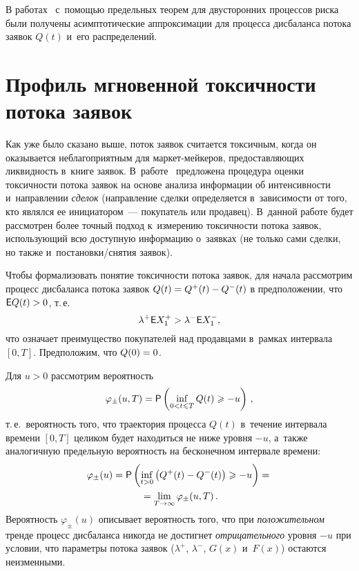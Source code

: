 \begin{multicols}{2}
В работах~\cite{Korolev_2013, Chertok2014, Korolev_2014}
с~помощью предельных \mbox{теорем} для двусторонних
процессов риска были получены асимптотические аппроксимации
для процесса дисбаланса потока заявок $Q(t)$ и~его распределений.

\section{Профиль мгновенной токсичности потока заявок}

Как уже было сказано выше, поток заявок считается токсичным, когда
он оказывается неблагоприятным для мар\-кет-мей\-ке\-ров, предоставляющих
ликвидность в~книге заявок. В~работе~\cite{Easley2012} предложена
процедура оценки токсичности потока заявок на основе анализа
информации об интенсивности и~направлении {\it сделок} (направление
сделки определяется в~зависимости от того, кто являлся ее
инициатором~--- покупатель или продавец).
В~данной работе будет рассмотрен более точный подход
к~измерению токсичности потока
заявок, использующий всю доступную информацию о~заявках (не только
сами сделки, но также и~по\-ста\-нов\-ки/сня\-тия заявок).

Чтобы формализовать понятие токсичности потока заявок, для начала
рассмотрим процесс дисбаланса потока заявок $Q(t)\hm=Q^+(t) \hm- Q^-(t)$
в предположении, что ${\sf E} Q(t) > 0$, т.\,е.\
$$
\lambda^+ {\sf E} X_1^+ > \lambda^- {\sf E} X_1^-,
$$
что означает преимущество покупателей над продавцами в~рамках
интервала $[0, T]$. Предположим, что $Q(0)\hm=0$.

Для $u > 0$ рассмотрим вероятность
$$
\varphi_{\pm}(u, T) = {\sf P}\left(\inf\limits_{0 < t \leqslant T} Q(t) \geqslant -u\right)\,,
$$
т.\,е.\ вероятность того, что траектория процесса $Q(t)$ в~течение
интервала времени $[0, T]$ целиком будет находиться не ниже уровня
$-u$, а~также аналогичную предельную вероятность на бесконечном
интервале времени:
\begin{multline*}
\varphi_{\pm}(u) = {\sf P}\left(\inf\limits_{t > 0} \left( Q^+(t) - Q^-(t) \right) \geqslant -u\right)
= {}\\
{}=\lim\limits_{T \to \infty} \varphi_{\pm}(u, T)\,.
\end{multline*}
Вероятность $\varphi_{\pm}(u)$ описывает вероятность того, что при {\it
положительном} тренде процесс дисбаланса никогда не достигнет {\it
отрицательного} уровня $-u$ при условии, что параметры потока заявок
($\lambda^+$, $\lambda^-$, $G(x)$ и~$F(x)$) остаются неизменными.


\smallskip


\end{multicols}
